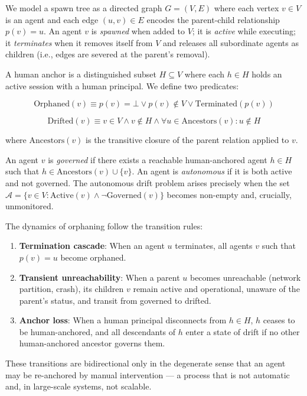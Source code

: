 We model a spawn tree as a directed graph $G = (V, E)$ where each vertex $v \in V$ is an agent and each edge $(u, v) \in E$ encodes the parent-child relationship $p(v) = u$. An agent $v$ is \textit{spawned} when added to $V$; it is \textit{active} while executing; it \textit{terminates} when it removes itself from $V$ and releases all subordinate agents as children (i.e., edges are severed at the parent's removal).

A human anchor is a distinguished subset $H \subseteq V$ where each $h \in H$ holds an active session with a human principal. We define two predicates:

\[
\text{Orphaned}(v) \equiv p(v) = \bot \lor p(v) \notin V \lor \text{Terminated}(p(v))
\]

\[
\text{Drifted}(v) \equiv v \in V \land v \notin H \land \forall u \in \text{Ancestors}(v): u \notin H
\]

where $\text{Ancestors}(v)$ is the transitive closure of the parent relation applied to $v$.

An agent $v$ is \textit{governed} if there exists a reachable human-anchored agent $h \in H$ such that $h \in \text{Ancestors}(v) \cup \{v\}$. An agent is \textit{autonomous} if it is both active and not governed. The autonomous drift problem arises precisely when the set $\mathcal{A} = \{ v \in V : \text{Active}(v) \land \neg \text{Governed}(v) \}$ becomes non-empty and, crucially, unmonitored.

The dynamics of orphaning follow the transition rules:

\begin{enumerate}
    \item \textbf{Termination cascade}: When an agent $u$ terminates, all agents $v$ such that $p(v) = u$ become orphaned.
    \item \textbf{Transient unreachability}: When a parent $u$ becomes unreachable (network partition, crash), its children $v$ remain active and operational, unaware of the parent's status, and transit from governed to drifted.
    \item \textbf{Anchor loss}: When a human principal disconnects from $h \in H$, $h$ ceases to be human-anchored, and all descendants of $h$ enter a state of drift if no other human-anchored ancestor governs them.
\end{enumerate}

These transitions are bidirectional only in the degenerate sense that an agent may be re-anchored by manual intervention — a process that is not automatic and, in large-scale systems, not scalable.


